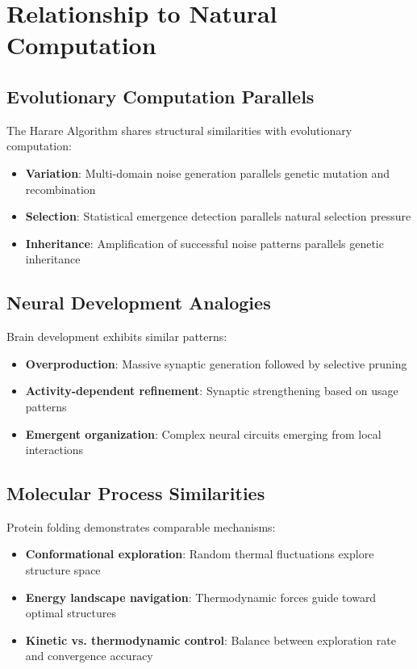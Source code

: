 \documentclass[11pt,a4paper]{article}
\theoremstyle{remark}
\begin{document}
\section{Relationship to Natural Computation}

\subsection{Evolutionary Computation Parallels}

The Harare Algorithm shares structural similarities with evolutionary computation:

\begin{itemize}
\item \textbf{Variation}: Multi-domain noise generation parallels genetic mutation and recombination
\item \textbf{Selection}: Statistical emergence detection parallels natural selection pressure
\item \textbf{Inheritance}: Amplification of successful noise patterns parallels genetic inheritance
\end{itemize}

\subsection{Neural Development Analogies}

Brain development exhibits similar patterns:
\begin{itemize}
\item \textbf{Overproduction}: Massive synaptic generation followed by selective pruning
\item \textbf{Activity-dependent refinement}: Synaptic strengthening based on usage patterns
\item \textbf{Emergent organization}: Complex neural circuits emerging from local interactions
\end{itemize}

\subsection{Molecular Process Similarities}

Protein folding demonstrates comparable mechanisms:
\begin{itemize}
\item \textbf{Conformational exploration}: Random thermal fluctuations explore structure space
\item \textbf{Energy landscape navigation}: Thermodynamic forces guide toward optimal structures
\item \textbf{Kinetic vs. thermodynamic control}: Balance between exploration rate and convergence accuracy
\end{itemize}
\end{document}
